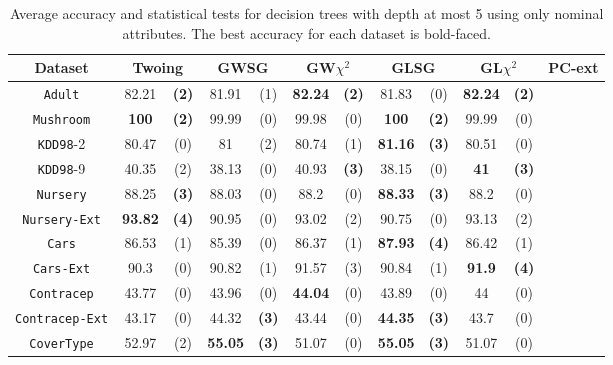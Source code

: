 \begin{table*}[t]
\small
\centering
\caption{Average accuracy and statistical tests  for  decision trees 
with depth at most 5 using only nominal attributes. The best accuracy for each dataset is bold-faced.}
\begin{tabular}{c|cc|cc|cc|cc|cc|cc} 
Dataset &        \multicolumn{2}{c|}{Twoing} &  \multicolumn{2}{c|}{GWSG}  
&   \multicolumn{2}{c|}{GW$\chi^2$}  &    \multicolumn{2}{c|}{GLSG} &   \multicolumn{2}{c|}{GL$\chi^2$}  & \multicolumn{2}{c}{PC-ext}\\  \hline   
{\tt Adult}         & 82.21 & {\bf  (2)} & 81.91 & (1) & {\bf  82.24} & {\bf  (2)} & 81.83 & (0) & {\bf  82.24} & {\bf  (2)} & & \\
{\tt Mushroom}      & {\bf  100}   & {\bf  (2)} & 99.99 & (0) & 99.98 & (0) & {\bf  100}   & {\bf  (2)} & 99.99 & (0) & & \\
{\tt KDD98}-2       & 80.47 & (0) & 81    & (2) & 80.74 & (1) & {\bf  81.16} & {\bf  (3)} & 80.51 & (0) & & \\
{\tt KDD98}-9       & 40.35 & (2) & 38.13 & (0) & 40.93 & {\bf  (3)} & 38.15 & (0) & {\bf  41 }   &{\bf   (3) }& & \\
{\tt Nursery}       & 88.25 & {\bf  (3)} & 88.03 & (0) & 88.2  & (0) & {\bf  88.33} & {\bf  (3)} & 88.2  & (0) & & \\
{\tt Nursery-Ext}   & {\bf  93.82} & {\bf  (4)} & 90.95 & (0) & 93.02 & (2) & 90.75 & (0) & 93.13 & (2) & & \\
{\tt Cars}          & 86.53 & (1) & 85.39 & (0) & 86.37 & (1) & {\bf  87.93} & {\bf  (4)} & 86.42 & (1) & & \\
{\tt Cars-Ext}      & 90.3  & (0) & 90.82 & (1) & 91.57 & (3) & 90.84 & (1) & {\bf  91.9}  & {\bf  (4)} & & \\
{\tt Contracep}     & 43.77 & (0) & 43.96 & (0) & {\bf  44.04} & (0) & 43.89 & (0) & 44    & (0) & & \\
{\tt Contracep-Ext} & 43.17 & (0) & 44.32 & {\bf  (3)} & 43.44 & (0) & {\bf  44.35} & {\bf  (3)} & 43.7  & (0) & & \\
{\tt CoverType}     & 52.97 & (2) & {\bf  55.05} & {\bf  (3)} & 51.07 & (0) & {\bf  55.05} & {\bf  (3)} & 51.07 & (0) & & \\

\end{tabular}
\end{table*}
